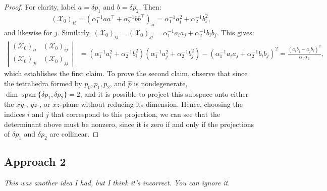 \documentclass{article}
\theoremstyle{definition}
\begin{document}
\begin{proof}
  For clarity, label $a = \delta p_1$ and $b = \delta p_2$. Then:
  \begin{align*}
    {(\mathcal{X}_0)}_{ii} = {(\alpha_1^{-1} aa^\top + \alpha_2^{-1} bb^\top)}_{ii} = \alpha_1^{-1} a_i^2 + \alpha_2^{-1} b_i^2,
  \end{align*}
  and likewise for $j$. Similarly,
  ${(\mathcal{X}_0)}_{ij} = {(\mathcal{X}_0)}_{ji} = \alpha_1^{-1} a_i
  a_j + \alpha_2^{-1} b_i b_j$. This gives:
  \begin{align*}
    \left|\begin{matrix}
      {(\mathcal{X}_0)}_{ii} & {(\mathcal{X}_0)}_{ij} \\
      {(\mathcal{X}_0)}_{ji} & {(\mathcal{X}_0)}_{jj}
    \end{matrix}\right| &= {(\alpha_1^{-1} a_i^2 + \alpha_2^{-1} b_i^2)}{(\alpha_1^{-1} a_j^2 + \alpha_2^{-1} b_j^2)} - {(\alpha_1^{-1} a_ia_j + \alpha_2^{-1} b_ib_j)}^2 = \frac{{(a_ib_j - a_jb_i)}^2}{\alpha_1 \alpha_2},
  \end{align*}
  which establishes the first claim. To prove the second claim,
  observe that since the tetrahedra formed by $p_0, p_1, p_2$, and
  $\hat{p}$ is nondegenerate,
  $\dim \operatorname{span}\{\delta p_1, \delta p_2\} = 2$, and it is
  possible to project this subspace onto either the $xy$-, $yz$-, or
  $xz$-plane without reducing its dimension. Hence, choosing the
  indices $i$ and $j$ that correspond to this projection, we can see
  that the determinant above must be nonzero, since it is zero if and
  only if the projections of $\delta p_1$ and $\delta p_2$ are
  collinear.
\end{proof}

\subsection*{Approach 2}

\noindent \emph{This was another idea I had, but I think it's incorrect. You can ignore it.} \\
\end{document}
